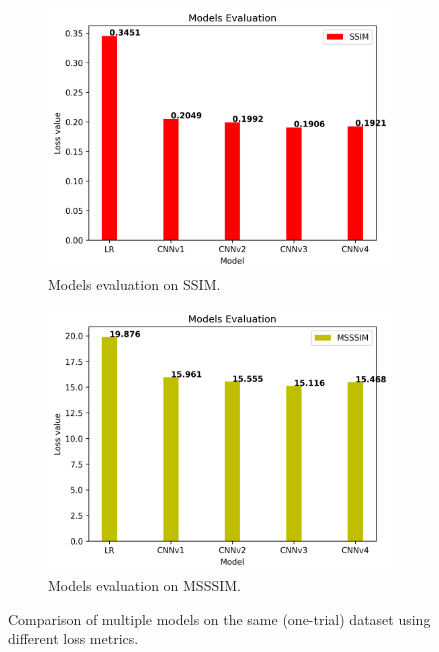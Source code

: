 \begin{figure}[H]
\begin{subfigure}[t]{0.45\textwidth}
    \includegraphics[width=\linewidth]{img/one-trial/models_evaluation_one_trial_ssim.png}
    \caption{Models evaluation on SSIM.}
  \end{subfigure}
  \begin{subfigure}[t]{0.45\textwidth}
    \centering
    \includegraphics[width=\linewidth]{img/one-trial/models_evaluation_one_trial_msssim.png}
    \caption{Models evaluation on MSSSIM.}
  \end{subfigure}
\caption{Comparison of multiple models on the same (one-trial) dataset using different loss metrics.}
\label{img:experiments:one-trial:comparison}
\end{figure}

